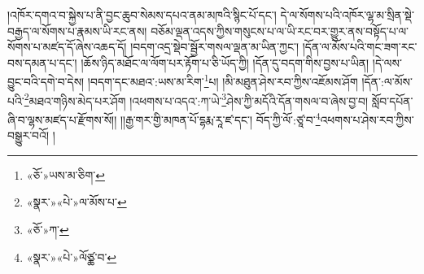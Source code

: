 །འཁོར་དགའ་བ་སྐྱེས་པ་ནི་བྱང་ཆུབ་སེམས་དཔའ་ནམ་མཁའི་སྙིང་པོ་དང་། དེ་ལ་སོགས་པའི་འཁོར་ལྷ་མ་སྲིན་སྡེ་བརྒྱད་ལ་སོགས་པ་རྣམས་ཡི་རང་ནས། བཅོམ་ལྡན་འདས་ཀྱིས་གསུངས་པ་ལ་ཡི་རང་བར་གྱུར་ནས་བསྟོད་པ་ལ་སོགས་པ་མཛད་དོ་ཞེས་འཆད་དོ། །བདག་འདྲ་སྡེབ་སྦྱོར་གསལ་ལྡན་མ་ཡིན་ཀྱང་། །དོན་ལ་མོས་པའི་གང་ཟག་རང་བས་དམན་པ་དང་། །ཆོས་ཉིད་མཐོང་ལ་ལོག་པར་རྟོག་པ་ཅི་ཡོད་ཀྱི། །དོན་དུ་བདག་གིས་བྱས་པ་ཡིན། །དེ་ལས་བྱུང་བའི་དགེ་བ་དེས། །བདག་དང་མཐའ་:ཡས་མ་རིག་\footnote{«ཅོ་»ཡས་མ་ཅིག་}པ། །མི་མཐུན་ཤེས་རབ་ཀྱིས་འཇོམས་ཤོག །དོན་:ལ་མོས་པའི་\footnote{«སྣར་»«པེ་»ལ་མོས་པ་}མཐའ་གཉིས་མེད་པར་ཤོག །འཕགས་པ་འདའ་:ཀ་ཡེ་\footnote{«ཅོ་»ཀ་}ཤེས་ཀྱི་མདོའི་དོན་གསལ་བ་ཞེས་བྱ་བ། སློབ་དཔོན་ཞི་བ་ལྷས་མཛད་པ་རྫོགས་སོ།། །།རྒྱ་གར་གྱི་མཁན་པོ་དྷརྨ་རཱ་ཛ་དང་། བོད་ཀྱི་ལོ་:ཙཱ་བ་\footnote{«སྣར་»«པེ་»ལོཙྪ་བ་}འཕགས་པ་ཤེས་རབ་ཀྱིས་བསྒྱུར་བའོ། ། 
